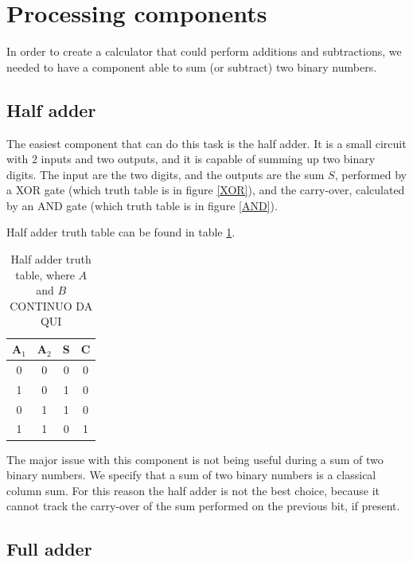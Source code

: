 \documentclass{article}
\begin{document}
\section{Processing components}

In order to create a calculator that could perform additions and subtractions, we needed to have a component able to sum (or subtract) two binary numbers.

\subsection{Half adder}

The easiest component that can do this task is the half adder. It is a small circuit with 2 inputs and two outputs, and it is capable of summing up two binary digits. The input are the two digits, and the outputs are the sum $S$, performed by a XOR gate (which truth table is in figure \ref{XOR}), and the carry-over, calculated by an AND gate (which truth table is in figure \ref{AND}).

\vspace{3mm}

Half adder truth table can be found in table \ref{HalfAdderTT}.

\begin{table}[h]
  \centering
  \begin{tabular}{| c | c || c | c |}
  \hline
  A$_1$ & A$_2$ & S & C \\ \hline
  0 & 0 & 0 & 0 \\ \hline
  1 & 0 & 1 & 0 \\ \hline
  0 & 1 & 1 & 0 \\ \hline
  1 & 1 & 0 & 1 \\ \hline
  \end{tabular}
  \caption{Half adder truth table, where $A$ and $B$ CONTINUO DA QUI}
  \label{HalfAdderTT}
\end{table}





The major issue with this component is not being useful during a sum of two binary numbers. We specify that a sum of two binary numbers is a classical column sum. For this reason the half adder is not the best choice, because it cannot track the carry-over of the sum performed on the previous bit, if present.

\subsection{Full adder}
\end{document}
